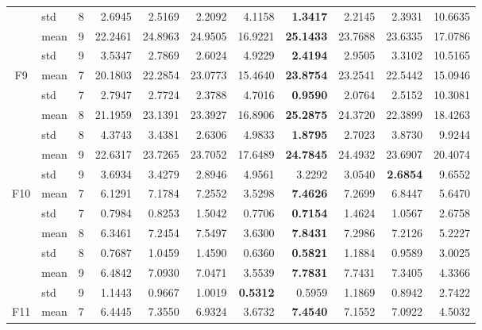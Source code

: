 \documentclass[conference]{IEEEtran}
\begin{document}
\begin{table}[]
\begin{tabular}{|c|l|l|r|r|r|r|r|r|r|r|}
 & std & 8 & 2.6945 & 2.5169 & 2.2092 & 4.1158 & \textbf{1.3417} & 2.2145 & 2.3931 & 10.6635 \\ \cline{2-11} 
 & mean & \multicolumn{1}{r|}{9} & 22.2461 & 24.8963 & 24.9505 & 16.9221 & \textbf{25.1433} & 23.7688 & 23.6335 & 17.0786 \\ \cline{2-11} 
 & std & 9 & 3.5347 & 2.7869 & 2.6024 & 4.9229 & \textbf{2.4194} & 2.9505 & 3.3102 & 10.5165 \\ \hline
\multirow{6}{*}{F9} & mean & \multicolumn{1}{r|}{7} & 20.1803 & 22.2854 & 23.0773 & 15.4640 & \textbf{23.8754} & 23.2541 & 22.5442 & 15.0946 \\ \cline{2-11} 
 & std & 7 & 2.7947 & 2.7724 & 2.3788 & 4.7016 & \textbf{0.9590} & 2.0764 & 2.5152 & 10.3081 \\ \cline{2-11} 
 & mean & \multicolumn{1}{r|}{8} & 21.1959 & 23.1391 & 23.3927 & 16.8906 & \textbf{25.2875} & 24.3720 & 22.3899 & 18.4263 \\ \cline{2-11} 
 & std & 8 & 4.3743 & 3.4381 & 2.6306 & 4.9833 & \textbf{1.8795} & 2.7023 & 3.8730 & 9.9244 \\ \cline{2-11} 
 & mean & \multicolumn{1}{r|}{9} & 22.6317 & 23.7265 & 23.7052 & 17.6489 & \textbf{24.7845} & 24.4932 & 23.6907 & 20.4074 \\ \cline{2-11} 
 & std & 9 & 3.6934 & 3.4279 & 2.8946 & 4.9561 & 3.2292 & 3.0540 & \textbf{2.6854} & 9.6552 \\ \hline
\multirow{6}{*}{F10} & mean & \multicolumn{1}{r|}{7} & 6.1291 & 7.1784 & 7.2552 & 3.5298 & \textbf{7.4626} & 7.2699 & 6.8447 & 5.6470 \\ \cline{2-11} 
 & std & 7 & 0.7984 & 0.8253 & 1.5042 & 0.7706 & \textbf{0.7154} & 1.4624 & 1.0567 & 2.6758 \\ \cline{2-11} 
 & mean & \multicolumn{1}{r|}{8} & 6.3461 & 7.2454 & 7.5497 & 3.6300 & \textbf{7.8431} & 7.2986 & 7.2126 & 5.2227 \\ \cline{2-11} 
 & std & 8 & 0.7687 & 1.0459 & 1.4590 & 0.6360 & \textbf{0.5821} & 1.1884 & 0.9589 & 3.0025 \\ \cline{2-11} 
 & mean & \multicolumn{1}{r|}{9} & 6.4842 & 7.0930 & 7.0471 & 3.5539 & \textbf{7.7831} & 7.7431 & 7.3405 & 4.3366 \\ \cline{2-11} 
 & std & 9 & 1.1443 & 0.9667 & 1.0019 & \textbf{0.5312} & 0.5959 & 1.1869 & 0.8942 & 2.7422 \\ \hline
\multirow{6}{*}{F11} & mean & \multicolumn{1}{r|}{7} & 6.4445 & 7.3550 & 6.9324 & 3.6732 & \textbf{7.4540} & 7.1552 & 7.0922 & 4.5032 \\ \cline{2-11} 

\end{tabular}
\end{table}
\end{document}
